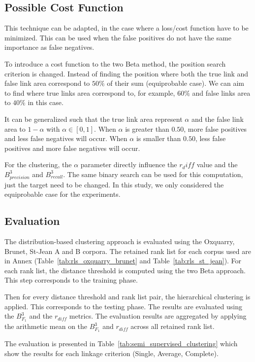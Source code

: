 \subsection{Possible Cost Function}

This technique can be adapted, in the case where a loss/cost function have to be minimized.
This can be used when the false positives do not have the same importance as false negatives.

To introduce a cost function to the two Beta method, the position search criterion is changed.
Instead of finding the position where both the true link and false link area correspond to $50\%$ of their sum (equiprobable case).
We can aim to find where true links area correspond to, for example, $60\%$ and false links area to $40\%$ in this case.

It can be generalized such that the true link area represent $\alpha$ and the false link area to $1-\alpha$ with $\alpha \in \left[0,1\right]$.
When $\alpha$ is greater than $0.50$, more false positives and less false negatives will occur.
When $\alpha$ is smaller than $0.50$, less false positives and more false negatives will occur.

For the clustering, the $\alpha$ parameter directly influence the $r_diff$ value and the $B^3_{precision}$ and $B^3_{recall}$.
The same binary search can be used for this computation, just the target need to be changed.
In this study, we only considered the equiprobable case for the experiments.

\subsection{Evaluation}

The distribution-based clustering approach is evaluated using the Oxquarry, Brunet, St-Jean A and B corpora.
The retained rank list for each corpus used are in Annex (Table~\ref{tab:rls_oxquarry_brunet} and Table~\ref{tab:rls_st_jean}).
For each rank list, the distance threshold is computed using the two Beta approach.
This step corresponds to the training phase.

Then for every distance threshold and rank list pair, the hierarchical clustering is applied.
This corresponds to the testing phase.
The results are evaluated using the $B^3_{F_1}$ and the $r_{diff}$ metrics.
The evaluation results are aggregated by applying the arithmetic mean on the $B^3_{F_1}$ and $r_{diff}$ across all retained rank list.

The evaluation is presented in Table~\ref{tab:semi_supervised_clustering} which show the results for each linkage criterion (Single, Average, Complete).

